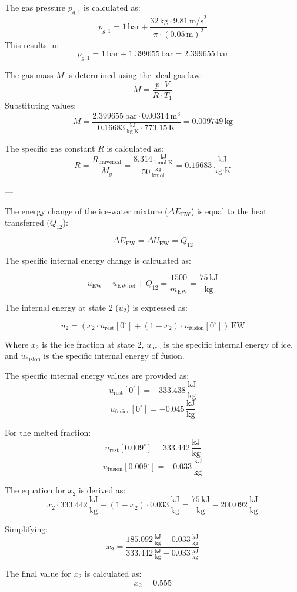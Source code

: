 The gas pressure \( p_{g,1} \) is calculated as:  
\[
p_{g,1} = 1 \, \text{bar} + \frac{32 \, \text{kg} \cdot 9.81 \, \text{m/s}^2}{\pi \cdot (0.05 \, \text{m})^2}
\]  
This results in:  
\[
p_{g,1} = 1 \, \text{bar} + 1.399655 \, \text{bar} = 2.399655 \, \text{bar}
\]  

The gas mass \( M \) is determined using the ideal gas law:  
\[
M = \frac{p \cdot V}{R \cdot T_1}
\]  
Substituting values:  
\[
M = \frac{2.399655 \, \text{bar} \cdot 0.00314 \, \text{m}^3}{0.16683 \, \frac{\text{kJ}}{\text{kg·K}} \cdot 773.15 \, \text{K}} = 0.009749 \, \text{kg}
\]  

The specific gas constant \( R \) is calculated as:  
\[
R = \frac{R_{\text{universal}}}{M_g} = \frac{8.314 \, \frac{\text{kJ}}{\text{kmol·K}}}{50 \, \frac{\text{kg}}{\text{kmol}}} = 0.16683 \, \frac{\text{kJ}}{\text{kg·K}}
\]  

---

The energy change of the ice-water mixture (\( \Delta E_{\text{EW}} \)) is equal to the heat transferred (\( Q_{12} \)):

\[
\Delta E_{\text{EW}} = \Delta U_{\text{EW}} = Q_{12}
\]

The specific internal energy change is calculated as:

\[
u_{\text{EW}} - u_{\text{EW,ref}} + Q_{12} = \frac{1500}{m_{\text{EW}}} = \frac{75 \, \text{kJ}}{\text{kg}}
\]

The internal energy at state 2 (\( u_2 \)) is expressed as:

\[
u_2 = (x_2 \cdot u_{\text{rest}}[0^\circ] + (1 - x_2) \cdot u_{\text{fusion}}[0^\circ]) \, \text{EW}
\]

Where \( x_2 \) is the ice fraction at state 2, \( u_{\text{rest}} \) is the specific internal energy of ice, and \( u_{\text{fusion}} \) is the specific internal energy of fusion.

The specific internal energy values are provided as:
\[
u_{\text{rest}}[0^\circ] = -333.438 \, \frac{\text{kJ}}{\text{kg}}
\]
\[
u_{\text{fusion}}[0^\circ] = -0.045 \, \frac{\text{kJ}}{\text{kg}}
\]

For the melted fraction:
\[
u_{\text{rest}}[0.009^\circ] = 333.442 \, \frac{\text{kJ}}{\text{kg}}
\]
\[
u_{\text{fusion}}[0.009^\circ] = -0.033 \, \frac{\text{kJ}}{\text{kg}}
\]

The equation for \( x_2 \) is derived as:
\[
x_2 \cdot 333.442 \, \frac{\text{kJ}}{\text{kg}} - (1 - x_2) \cdot 0.033 \, \frac{\text{kJ}}{\text{kg}} = \frac{75 \, \text{kJ}}{\text{kg}} - 200.092 \, \frac{\text{kJ}}{\text{kg}}
\]

Simplifying:
\[
x_2 = \frac{185.092 \, \frac{\text{kJ}}{\text{kg}} - 0.033 \, \frac{\text{kJ}}{\text{kg}}}{333.442 \, \frac{\text{kJ}}{\text{kg}} - 0.033 \, \frac{\text{kJ}}{\text{kg}}}
\]

The final value for \( x_2 \) is calculated as:
\[
x_2 = 0.555
\]